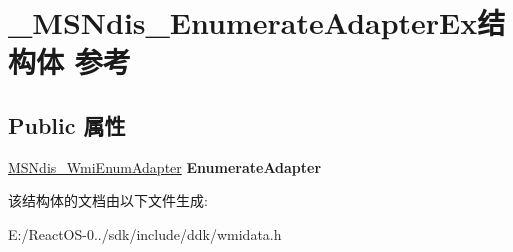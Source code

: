 \hypertarget{struct___m_s_ndis___enumerate_adapter_ex}{}\section{\+\_\+\+M\+S\+Ndis\+\_\+\+Enumerate\+Adapter\+Ex结构体 参考}
\label{struct___m_s_ndis___enumerate_adapter_ex}
\subsection*{Public 属性}
\begin{DoxyCompactItemize}
\item 
\mbox{\label{struct___m_s_ndis___enumerate_adapter_ex_a9076c07d650a24237d7b51adfb3ffeb9}} 
\hyperlink{struct___m_s_ndis___wmi_enum_adapter}{M\+S\+Ndis\+\_\+\+Wmi\+Enum\+Adapter} {\bfseries Enumerate\+Adapter}
\end{DoxyCompactItemize}


该结构体的文档由以下文件生成\+:\begin{DoxyCompactItemize}
\item 
E\+:/\+React\+O\+S-\/0../sdk/include/ddk/wmidata.\+h\end{DoxyCompactItemize}
